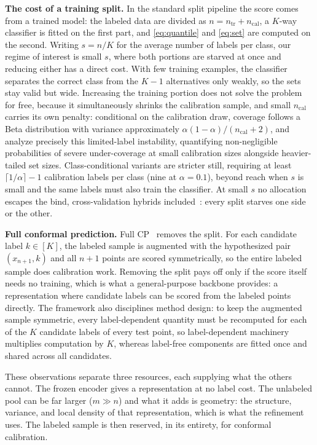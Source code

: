 \textbf{The cost of a training split.} In the standard split pipeline
the score comes from a trained model: the labeled data are divided as
$n = n_{\mathrm{tr}} + n_{\mathrm{cal}}$, a $K$-way classifier is
fitted on the first part, and \eqref{eq:quantile} and \eqref{eq:set}
are computed on the second. Writing $s = n/K$ for the average number
of labels per class, our regime of interest is small $s$, where both
portions are starved at once and reducing either has a direct cost.
With few training examples, the classifier separates the correct class
from the $K-1$ alternatives only weakly, so the sets stay valid but wide.
Increasing the training portion does not solve
the problem for free, because it simultaneously shrinks the calibration
sample, and small $n_{\mathrm{cal}}$ carries its own penalty:
conditional on the calibration draw, coverage follows a Beta
distribution with variance approximately
$\alpha(1-\alpha)/(n_{\mathrm{cal}}+2)$, and \citet{zhou2026semicp}
analyze precisely this limited-label instability, quantifying
non-negligible probabilities of severe under-coverage at small
calibration sizes alongside heavier-tailed set sizes.
Class-conditional variants are stricter still, requiring at least
$\lceil 1/\alpha \rceil - 1$ calibration labels per class (nine at
$\alpha = 0.1$), beyond reach when $s$ is small and the same labels
must also train the classifier. At small $s$ no allocation escapes the bind, cross-validation hybrids included~\citep{barber2021predictive}: every split starves one side or the other.

\textbf{Full conformal prediction.} Full CP~\citep{vovk2005algorithmic}
removes the split. For each candidate label
$k \in [K]$, the labeled sample is augmented with the hypothesized pair
$(x_{n+1}, k)$ and all $n{+}1$ points are scored symmetrically, so the
entire labeled sample does calibration work. Removing the split pays off only
if the score itself needs no training, which is what a general-purpose backbone provides: a representation where candidate labels can be scored from the labeled points directly.
The framework also disciplines method design: to keep the augmented sample symmetric,
every label-dependent quantity must be recomputed for each of the $K$
candidate labels of every test point, so label-dependent machinery
multiplies computation by $K$, whereas label-free components are fitted
once and shared across all candidates.

These observations separate three resources, each supplying what the others cannot. The frozen encoder gives a representation at no label cost. The unlabeled pool can be far larger ($m \gg n$)
and what it adds is geometry: the structure, variance, and local density of that representation, which is what the refinement uses. The labeled sample is then reserved, in its entirety, for conformal calibration.

